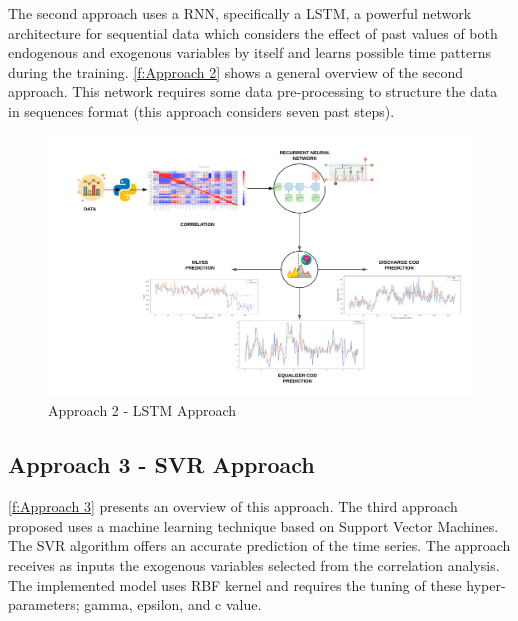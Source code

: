 The second approach uses a \ac{RNN}, specifically a \ac{LSTM}, a powerful network architecture for sequential data which considers the effect of past values of both endogenous and exogenous variables by itself and learns possible time patterns during the training. \autoref{f:Approach 2} shows a general overview of the second approach. This network requires some data pre-processing to structure the data in sequences format (this approach considers seven past steps).

\begin{figure}[h]
\centering
\includegraphics[width=\linewidth]{figures/Ch4/Approach2.pdf}
\caption{Approach 2 - LSTM Approach}
\label{f:Approach 2}
\end{figure}

\subsection{Approach 3 - SVR Approach}
\label{s:Approach3}

\autoref{f:Approach 3} presents an overview of this approach. The third approach proposed uses a machine learning technique based on Support Vector Machines. The \ac{SVR} algorithm offers an accurate prediction of the time series. The approach receives as inputs the exogenous variables selected from the correlation analysis. The implemented model uses \ac{RBF} kernel and requires the tuning of these hyper-parameters; gamma, epsilon, and c value. 

